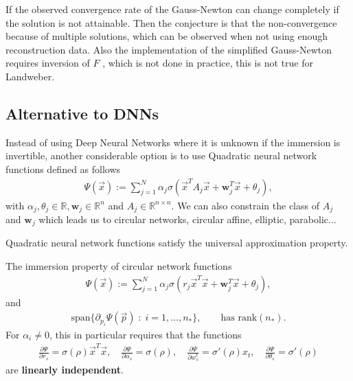 If the observed convergence rate of the Gauss-Newton can change completely if the
solution is not attainable. Then the conjecture is that the non-convergence
because of multiple solutions, which can be observed when not using enough
reconstruction data.
Also the implementation of the simplified Gauss-Newton requires inversion of
$F$ , which is not done in practice, this is not true for Landweber.
\subsection{Alternative to DNNs}
Instead of using Deep Neural Networks where it is unknown if
the immersion is invertible, another considerable option is to use
Quadratic neural network functions defined as follows
\begin{align}
    \Psi(\vec{x}) := \sum_{j=1}^{N} \alpha_j\sigma\left(\vec{x}^{T}A_j\vec{x}
        + \mathbf{w}_j^{T}\vec{x} + \theta_j \right),
\end{align}
with $\alpha_j, \theta_j \in \mathbb{R}, \mathbf{w}_j \in \mathbb{R}^{n}$
and $A_j \in \mathbb{R}^{n \times n}$. We can also constrain the class of
$A_j$ and $\mathbf{w}_j$ which leads us to circular networks, circular
affine, elliptic, parabolic...
\begin{theorem}
    Quadratic neural network functions satisfy the universal approximation
    property.
\end{theorem}
The immersion property of circular network functions
\begin{align}
    \Psi(\vec{x}) := \sum_{j=1}^{N} \alpha_j\sigma\left(r_j\vec{x}^{T}\vec{x}
        + \mathbf{w}_j^{T}\vec{x} + \theta_j \right),
\end{align}
and
\begin{align}
    \text{span}\{\partial_{p_i}\Psi(\vec{p})\;:\;i=1,\ldots,n_*\}, \qquad
    \text{has rank}(n_*).
\end{align}
For $\alpha_i \neq 0$, this in particular requires that the functions
\begin{align}
    \frac{\partial \Psi}{\partial r_s}  = \sigma\left( \rho \right)
    \vec{x}^{T}\vec{x}, \quad
    \frac{\partial \Psi}{\partial \alpha_s}  = \sigma\left( \rho \right)
    , \quad
    \frac{\partial \Psi}{\partial w_s^{t}}  = \sigma'\left( \rho \right)
    x_t,\quad
    \frac{\partial \Psi}{\partial \theta_s}  = \sigma'\left( \rho \right)
\end{align}
are \textbf{linearly independent}.
\newline


